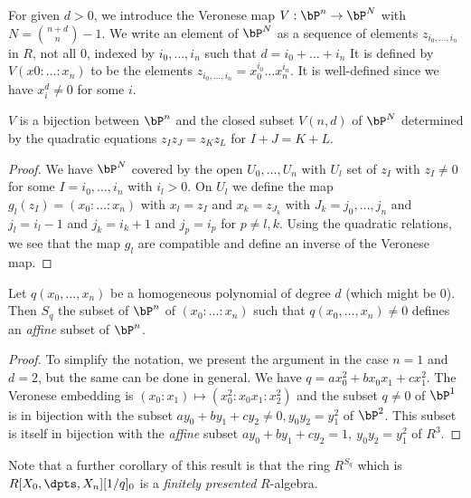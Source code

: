 For given $d>0$, we introduce the Veronese map $V: \bP^n\rightarrow \bP^N$ with $N = \binom{n+d}{n}-1$.
We write an element of $\bP^N$ as a sequence of elements $z_{i_0,\dots,i_n}$ in $R$, not all $0$,
indexed by $i_0,\dots,i_n$ such that $d = i_0+\dots+i_n$
It is defined by $V(x0:\dots:x_n)$ to be the elements $z_{i_0,\dots,i_n} = x_0^{i_0}\dots x_n^{i_n}$. It is well-defined
since we have $x_i^d\neq 0$ for some $i$.

\begin{proposition}\label{veronese}
  $V$ is a bijection between $\bP^n$ and the closed subset $V(n,d)$ of $\bP^N$ determined by the quadratic
  equations $z_Iz_J = z_Kz_L$ for $I+J=K+L$.
\end{proposition}

\begin{proof}
  We have $\bP^N$ covered by the open $U_0,\dots,U_n$ with $U_l$ set of $z_I$ with $z_I\neq 0$
  for some $I = i_0,\dots,i_n$ with $i_l>0$. On $U_l$ we define the map $g_l(z_I) = (x_0:\dots:x_n)$
  with $x_l = z_I$ and $x_k = z_{J_k}$ with $J_k = j_0,\dots,j_n$ and $j_l = i_l-1$ and $j_k = i_k+1$
  and $j_p = i_p$ for $p\neq l,k$. Using the quadratic relations, we see that the map $g_l$
  are compatible and define an inverse of the Veronese map.
\end{proof}

\begin{corollary}\label{affine}
  Let $q(x_0,\dots,x_n)$ be a homogeneous polynomial of degree $d$ (which might be $0$). Then $S_q$ the subset
  of $\bP^n$ of $(x_0:\dots:x_n)$ such that $q(x_0,\dots,x_n)\neq 0$
  defines an {\em affine} subset of $\bP^n$.
\end{corollary}

\begin{proof}
  To simplify the notation, we present the argument in the case $n=1$ and $d=2$, but the same can be done
  in general. We have $q = ax_0^2 + bx_0x_1+cx_1^2$. The Veronese embedding is $(x_0:x_1)\mapsto (x_0^2:x_0x_1:x_2^2)$
  and the subset $q\neq 0$ of $\bP^1$ is in bijection with the subset $ay_0+by_1+cy_2\neq 0, y_0y_2 = y_1^2$ of $\bP^2$.
  This subset is itself in bijection with the {\em affine} subset $ay_0+by_1+cy_2 = 1, ~y_0y_2=y_1^2$ of $R^3$.
\end{proof}

Note that a further corollary of this result is that the ring $R^{S_q}$ which is $R[X_0,\dpts,X_n][1/q]_0$ is
a {\em finitely presented} $R$-algebra.
